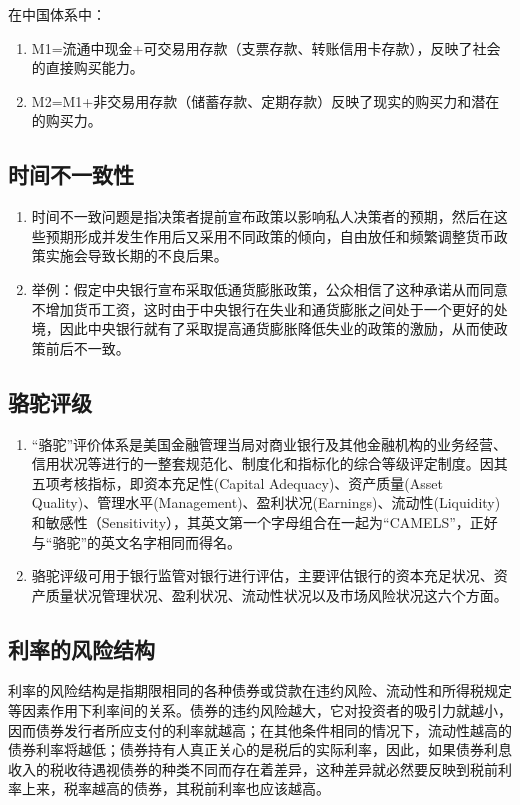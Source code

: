 \documentclass{article}
\begin{document}
\noindent 在中国体系中：
    \begin{enumerate}
    	\item M1=流通中现金+可交易用存款（支票存款、转账信用卡存款），反映了社会的直接购买能力。%
    	\item M2=M1+非交易用存款（储蓄存款、定期存款）反映了现实的购买力和潜在的购买力。%
	\end{enumerate}
	
\subsection{时间不一致性}

\begin{enumerate}
	\item  时间不一致问题是指决策者提前宣布政策以影响私人决策者的预期，然后在这些预期形成并发生作用后又采用不同政策的倾向，自由放任和频繁调整货币政策实施会导致长期的不良后果。
	\item  举例：假定中央银行宣布采取低通货膨胀政策，公众相信了这种承诺从而同意不增加货币工资，这时由于中央银行在失业和通货膨胀之间处于一个更好的处境，因此中央银行就有了采取提高通货膨胀降低失业的政策的激励，从而使政策前后不一致。
\end{enumerate}

\subsection{骆驼评级}

\begin{enumerate}
	\item “骆驼”评价体系是美国金融管理当局对商业银行及其他金融机构的业务经营、信用状况等进行的一整套规范化、制度化和指标化的综合等级评定制度。因其五项考核指标，即资本充足性(Capital Adequacy)、资产质量(Asset Quality)、管理水平(Management)、盈利状况(Earnings)、流动性(Liquidity)和敏感性（Sensitivity），其英文第一个字母组合在一起为“CAMELS”，正好与“骆驼”的英文名字相同而得名。
	\item 骆驼评级可用于银行监管对银行进行评估，主要评估银行的资本充足状况、资产质量状况管理状况、盈利状况、流动性状况以及市场风险状况这六个方面。
\end{enumerate}

\subsection{利率的风险结构}
利率的风险结构是指期限相同的各种债券或贷款在违约风险、流动性和所得税规定等因素作用下利率间的关系。债券的违约风险越大，它对投资者的吸引力就越小，因而债券发行者所应支付的利率就越高；在其他条件相同的情况下，流动性越高的债券利率将越低；债券持有人真正关心的是税后的实际利率，因此，如果债券利息收入的税收待遇视债券的种类不同而存在着差异，这种差异就必然要反映到税前利率上来，税率越高的债券，其税前利率也应该越高。
\end{document}
